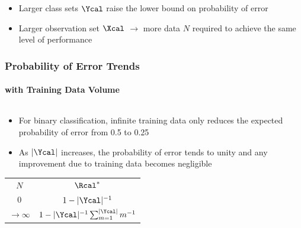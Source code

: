 \documentclass[aspectratio=169]{beamer}
\begin{document}
\begin{frame}
\begin{columns}[c]
\begin{column}{.5\linewidth}
\end{column}

\end{columns}

\begin{itemize}
\item Larger class sets $\Ycal$ raise the lower bound on probability of error
\item Larger observation set $\Xcal$ $\longrightarrow$ more data $N$ required to achieve the same level of performance
\end{itemize}

\end{frame}




\begin{frame}
\frametitle{Probability of Error Trends}
\framesubtitle{with Training Data Volume}

\begin{columns}[c]

\begin{column}{.5\linewidth}

\begin{itemize}
\item For binary classification, infinite training data only reduces the expected probability of error from 0.5 to 0.25
\item As $|\Ycal|$ increases, the probability of error tends to unity and any improvement due to training data becomes negligible
\end{itemize}

\begin{table}
\renewcommand{\arraystretch}{1.3}
\begin{tabular}{| c | c |}
\hline 
$N$ & $\Rcal^*$ \\
\hhline{|=|=|}
$0$ & $1 - |\Ycal|^{-1}$  \\ 
\hline
$\to \infty$ & $1 - |\Ycal|^{-1} \sum_{m=1}^{|\Ycal|} m^{-1}$ \\
\hline
\end{tabular}
\end{table}

\end{column}

\begin{column}{.5\linewidth}


\end{column}
\end{columns}
\end{frame}
\end{document}

